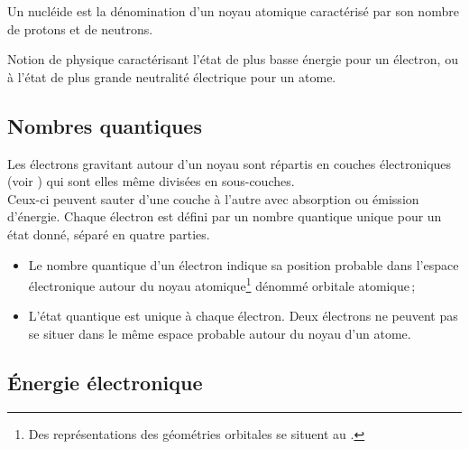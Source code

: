 \begin{definition}[Nucléide]
Un nucléide est la dénomination d'un noyau atomique caractérisé par son nombre de protons et de neutrons.
\end{definition}

\begin{definition}
Notion de physique caractérisant l'état de plus basse énergie pour un électron, ou à l'état de plus grande neutralité électrique pour un atome.
\end{definition}

\subsection{Nombres quantiques}

Les électrons gravitant autour d'un noyau sont répartis en couches électroniques (voir ) qui sont elles même divisées en sous-couches.\\Ceux-ci peuvent sauter d'une couche à l'autre avec absorption ou émission d'énergie. Chaque électron est défini par un nombre quantique unique pour un état donné, séparé en quatre parties.

\begin{itemize}
	\item Le nombre quantique d'un électron indique sa position probable dans l'espace électronique autour du noyau atomique\footnote{Des représentations des géométries orbitales se situent au .} dénommé orbitale atomique\,;
	\item L'état quantique est unique à chaque électron. Deux électrons ne peuvent pas se situer dans le même espace probable autour du noyau d'un atome.
\end{itemize}

\pagebreak

\pagebreak



\subsection{\'Energie électronique}

